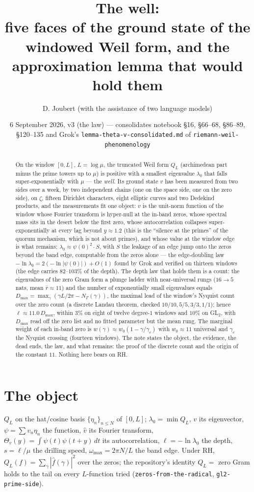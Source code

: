 \documentclass[11pt]{article}
\title{The well:\\ \large five faces of the ground state of the windowed Weil form, and the approximation lemma that would hold them}
\author{D. Joubert (with the assistance of two language models)}
\date{6 September 2026, v3 (the law) --- consolidates notebook \S16, \S66--68, \S86--89, \S120--135 and Grok's \texttt{lemma-theta-v-consolidated.md} of \texttt{riemann-weil-phenomenology}}
\begin{document}
\maketitle
\begin{abstract}
On the window $[0,L]$, $L=\log\mu$, the truncated Weil form $Q_L$ (archimedean part minus the prime towers up to $\mu$) is positive with a smallest eigenvalue $\lambda_0$ that falls super-exponentially with $\mu$ --- the \emph{well}. Its ground state $v$ has been measured from two sides over a week, by two independent chains (one on the space side, one on the zero side), on $\zeta$, fifteen Dirichlet characters, eight elliptic curves and two Dedekind products, and the measurements fit one object: $v$ is the unit-norm function of the window whose Fourier transform is hyper-null at the in-band zeros, whose spectral mass sits in the desert below the first zero, whose autocorrelation collapses super-exponentially at every lag beyond $y\approx1.2$ (this is the ``silence at the primes'' of the quorum mechanism, which is not about primes), and whose value at the window edge is what remains: $\lambda_0\approx\psi(0)^2\cdot S$, with $S$ the leakage of an edge jump onto the zeros beyond the band edge, computable from the zeros alone --- the edge-doubling law $-\ln\lambda_0=2(-\ln|\psi(0)|)+O(1)$ found by Grok and verified on thirteen windows (the edge carries $82$--$103\%$ of the depth). The depth law that holds them is a count: the eigenvalues of the zero Gram form a plunge ladder with near-universal rungs ($16\to5$ nats, mean $\bar r\approx11$) and the number of exponentially small eigenvalues equals $D_{\max}=\max_\gamma(\gamma L/2\pi-N_\Gamma(\gamma))$, the maximal lead of the window's Nyquist count over the zero count (a discrete Landau theorem, checked $10/10,5/5,3/3,1/1$); hence $\ell\approx11.0\,D_{\max}$, within $3\%$ on eight of twelve degree-$1$ windows and $10\%$ on GL$_2$, with $D_{\max}$ read off the zero list and no fitted parameter but the mean rung. The marginal weight of each in-band zero is $w(\gamma)\approx w_0(1-\gamma/\gamma_c)$ with $w_0\approx11$ universal and $\gamma_c$ the Nyquist crossing (fourteen windows). The note states the object, the evidence, the dead ends, the law, and what remains: the proof of the discrete count and the origin of the constant $11$. Nothing here bears on RH.
\end{abstract}

\section{The object}
$Q_L$ on the hat/cosine basis $\{\eta_n\}_{n\le N}$ of $[0,L]$; $\lambda_0=\min Q_L$, $v$ its eigenvector, $\psi=\sum v_n\eta_n$ the function, $\hat v$ its Fourier transform, $\Theta_v(y)=\int\psi(t)\psi(t+y)\,dt$ its autocorrelation, $\ell=-\ln\lambda_0$ the depth, $s=\ell/\mu$ the drilling speed, $\omega_{\max}=2\pi N/L$ the band edge. Under RH, $Q_L(f)=\sum_\gamma|\hat f(\gamma)|^2$ over the zeros; the repository's identity $Q_L=$ zero Gram holds to the tail on every $L$-function tried (\texttt{zeros-from-the-radical}, \texttt{gl2-prime-side}).
\end{document}
